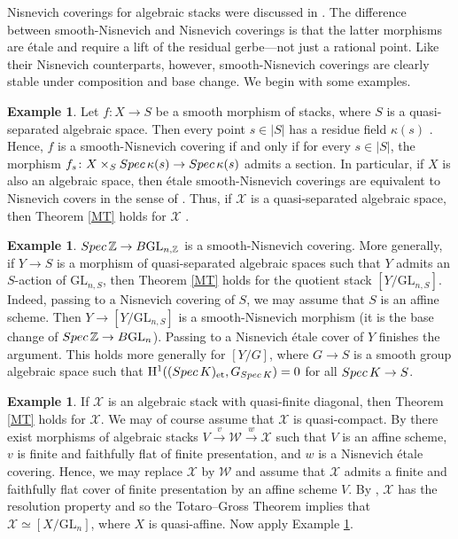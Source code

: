 \documentclass[10pt]{amsart}
\theoremstyle{plain}
\theoremstyle{definition}
\newtheorem{example}[thm]{Example}
\newcommand{\Spec}{{\rm Spec \,}}
\newcommand{\Z}{{\mathbb Z}}
\newcommand{\spref}[1]{\href{http://stacks.math.columbia.edu/tag/#1}{#1}}
\begin{document}
Nisnevich coverings for algebraic stacks were discussed in
\cite[\S3]{MR3754421}. The difference between smooth-Nisnevich and
Nisnevich coverings is that the latter morphisms are \'etale and
require a lift of the residual gerbe---not just a rational point. Like
their Nisnevich counterparts, however, smooth-Nisnevich coverings are
clearly stable under composition and base change. We begin with some
examples.
\begin{example}\label{ex:alg-sp}
	Let $f \colon X \to S$ be a smooth morphism of stacks, where $S$ is
	a quasi-separated algebraic space. Then every point $s\in |S|$ has a
	residue field $\kappa(s)$ \cite[Tag
	\spref{03JV}]{stacks-project}. Hence, $f$ is a smooth-Nisnevich
	covering if and only if for every $s \in |S|$, the morphism
	$f_s \colon X\times_S \Spec \kappa(s) \to \Spec \kappa(s)$ admits a
	section. In particular, if $X$ is also an algebraic space, then
	\'etale smooth-Nisnevich coverings are equivalent to Nisnevich
	covers in the sense of \cite[\S3]{MR3754421}. Thus, if
	$\mathcal{X}$ is a quasi-separated algebraic space, then Theorem
	\ref{MT} holds for $\mathcal{X}$ \cite[Prop.~5.7.6]{MR308104}.
\end{example}
\begin{example}\label{ex:gln-nis-sm}
	$\Spec \Z \to B\mathrm{GL}_{n,\Z}$ is a smooth-Nisnevich covering. More
	generally, if $Y \to S$ is a morphism of quasi-separated algebraic
	spaces such that $Y$ admits an $S$-action of $\mathrm{GL}_{n,S}$, then
	Theorem \ref{MT} holds for the quotient stack
	$[Y/\mathrm{GL}_{n,S}]$. Indeed, passing to a Nisnevich covering of $S$, we
	may assume that $S$ is an affine scheme. Then $Y \to [Y/\mathrm{GL}_{n,S}]$
	is a smooth-Nisnevich morphism (it is the base change of
	$\Spec \Z \to B\mathrm{GL}_n$). Passing to a Nisnevich \'etale cover of $Y$
	finishes the argument. This holds more generally for $[Y/G]$, where
	$G \to S$ is a smooth group algebraic space such that
	$\mathrm{H}^1((\Spec K)_{\mathrm{et}},G_{\Spec K})=0$ for all
	$\Spec K \to S$.
\end{example}
\begin{example}\label{ex:quasi-dm}
	If $\mathcal{X}$ is an algebraic stack with quasi-finite diagonal,
	then Theorem \ref{MT} holds for $\mathcal{X}$. We may of course
	assume that $\mathcal{X}$ is quasi-compact. By
	\cite[Thm.~4.1]{MR3754421} there exist morphisms of algebraic
	stacks $V \xrightarrow{v} \mathcal{W} \xrightarrow{w} \mathcal{X}$
	such that $V$ is an affine scheme, $v$ is finite and faithfully flat
	of finite presentation, and $w$ is a Nisnevich \'etale
	covering. Hence, we may replace $\mathcal{X}$ by $\mathcal{W}$ and
	assume that $\mathcal{X}$ admits a finite and faithfully flat cover
	of finite presentation by an affine scheme $V$. By
	\cite[Prop.~4.3(vii)]{GrossRes}, $\mathcal{X}$ has the
	resolution property and so the Totaro--Gross Theorem
	\cite[Thm.~5.4]{GrossRes} implies that
	$\mathcal{X} \simeq [X/\mathrm{GL}_n]$, where $X$ is quasi-affine. Now apply
	Example \ref{ex:gln-nis-sm}.
\end{example}
\end{document}
